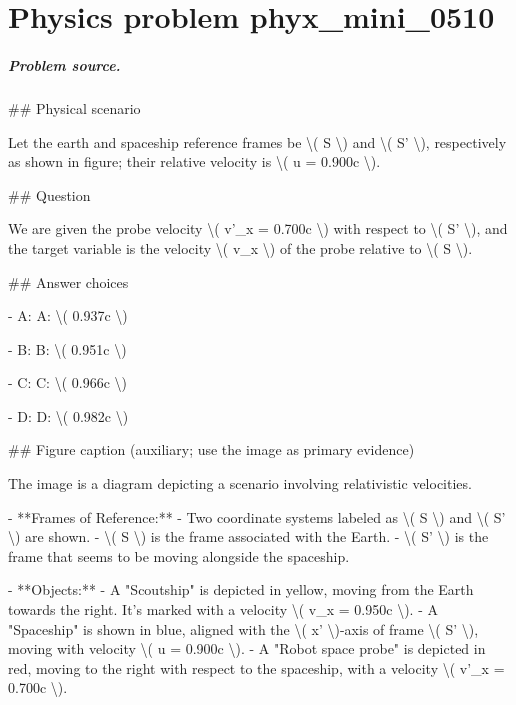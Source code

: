
\chapter{Physics problem phyx\_mini\_0510}
\label{ch:PhyXMiniProblems_problem_phyx_mini_0510}

\paragraph{Problem source.}
\#\# Physical scenario

Let the earth and spaceship reference frames be \textbackslash{}( S \textbackslash{}) and \textbackslash{}( S' \textbackslash{}), respectively as shown in figure; their relative velocity is \textbackslash{}( u = 0.900c \textbackslash{}).

\#\# Question

We are given the probe velocity \textbackslash{}( v'\_x = 0.700c \textbackslash{}) with respect to \textbackslash{}( S' \textbackslash{}), and the target variable is the velocity \textbackslash{}( v\_x \textbackslash{}) of the probe relative to \textbackslash{}( S \textbackslash{}).

\#\# Answer choices

- A: A: \textbackslash{}( 0.937c \textbackslash{})

- B: B: \textbackslash{}( 0.951c \textbackslash{})

- C: C: \textbackslash{}( 0.966c \textbackslash{})

- D: D: \textbackslash{}( 0.982c \textbackslash{})

\#\# Figure caption (auxiliary; use the image as primary evidence)

The image is a diagram depicting a scenario involving relativistic velocities. 

- **Frames of Reference:** 
  - Two coordinate systems labeled as \textbackslash{}( S \textbackslash{}) and \textbackslash{}( S' \textbackslash{}) are shown. 
  - \textbackslash{}( S \textbackslash{}) is the frame associated with the Earth.
  - \textbackslash{}( S' \textbackslash{}) is the frame that seems to be moving alongside the spaceship.

- **Objects:**
  - A "Scoutship" is depicted in yellow, moving from the Earth towards the right. It's marked with a velocity \textbackslash{}( v\_x = 0.950c \textbackslash{}).
  - A "Spaceship" is shown in blue, aligned with the \textbackslash{}( x' \textbackslash{})-axis of frame \textbackslash{}( S' \textbackslash{}), moving with velocity \textbackslash{}( u = 0.900c \textbackslash{}).
  - A "Robot space probe" is depicted in red, moving to the right with respect to the spaceship, with a velocity \textbackslash{}( v'\_x = 0.700c \textbackslash{}).


